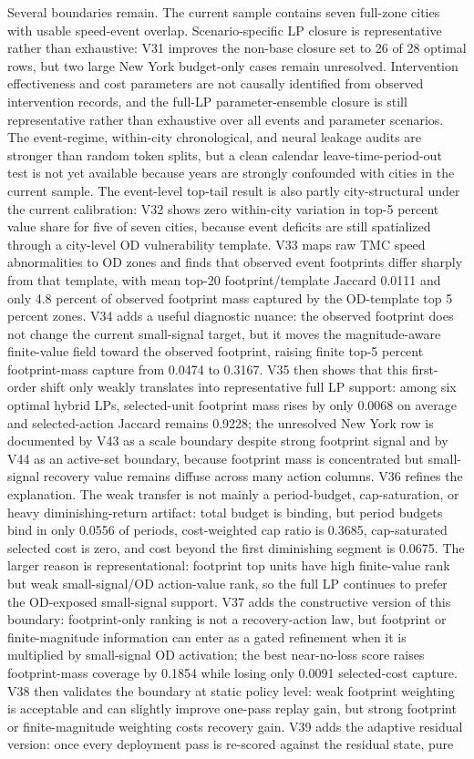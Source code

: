 Several boundaries remain. The current sample contains seven full-zone cities with usable speed-event overlap. Scenario-specific LP closure is representative rather than exhaustive: V31 improves the non-base closure set to 26 of 28 optimal rows, but two large New York budget-only cases remain unresolved. Intervention effectiveness and cost parameters are not causally identified from observed intervention records, and the full-LP parameter-ensemble closure is still representative rather than exhaustive over all events and parameter scenarios. The event-regime, within-city chronological, and neural leakage audits are stronger than random token splits, but a clean calendar leave-time-period-out test is not yet available because years are strongly confounded with cities in the current sample. The event-level top-tail result is also partly city-structural under the current calibration: V32 shows zero within-city variation in top-5 percent value share for five of seven cities, because event deficits are still spatialized through a city-level OD vulnerability template. V33 maps raw TMC speed abnormalities to OD zones and finds that observed event footprints differ sharply from that template, with mean top-20 footprint/template Jaccard 0.0111 and only 4.8 percent of observed footprint mass captured by the OD-template top 5 percent zones. V34 adds a useful diagnostic nuance: the observed footprint does not change the current small-signal target, but it moves the magnitude-aware finite-value field toward the observed footprint, raising finite top-5 percent footprint-mass capture from 0.0474 to 0.3167. V35 then shows that this first-order shift only weakly translates into representative full LP support: among six optimal hybrid LPs, selected-unit footprint mass rises by only 0.0068 on average and selected-action Jaccard remains 0.9228; the unresolved New York row is documented by V43 as a scale boundary despite strong footprint signal and by V44 as an active-set boundary, because footprint mass is concentrated but small-signal recovery value remains diffuse across many action columns. V36 refines the explanation. The weak transfer is not mainly a period-budget, cap-saturation, or heavy diminishing-return artifact: total budget is binding, but period budgets bind in only 0.0556 of periods, cost-weighted cap ratio is 0.3685, cap-saturated selected cost is zero, and cost beyond the first diminishing segment is 0.0675. The larger reason is representational: footprint top units have high finite-value rank but weak small-signal/OD action-value rank, so the full LP continues to prefer the OD-exposed small-signal support. V37 adds the constructive version of this boundary: footprint-only ranking is not a recovery-action law, but footprint or finite-magnitude information can enter as a gated refinement when it is multiplied by small-signal OD activation; the best near-no-loss score raises footprint-mass coverage by 0.1854 while losing only 0.0091 selected-cost capture. V38 then validates the boundary at static policy level: weak footprint weighting is acceptable and can slightly improve one-pass replay gain, but strong footprint or finite-magnitude weighting costs recovery gain. V39 adds the adaptive residual version: once every deployment pass is re-scored against the residual state, pure 